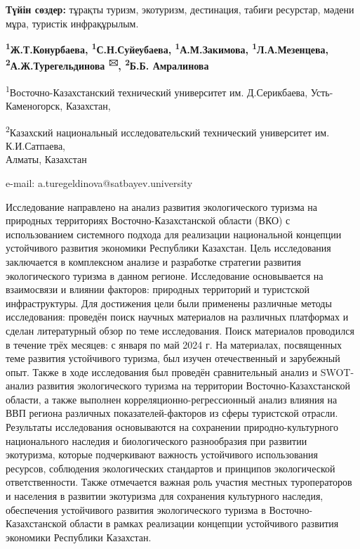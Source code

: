 {\bfseries Түйін сөздер:} тұрақты туризм, экотуризм, дестинация, табиғи
ресурстар, мәдени мұра, туристік инфрақұрылым.


\begin{center}
{\bfseries \textsuperscript{1}Ж.Т.Конурбаева,
\textsuperscript{1}С.Н.Суйеубаева, \textsuperscript{1}А.М.Закимова,
\textsuperscript{1}Л.А.Мезенцева,\\
\textsuperscript{2}А.Ж.Турегельдинова \textsuperscript{🖂},
\textsuperscript{2}Б.Б. Амралинова}

\textsuperscript{1}Восточно-Казахстанский технический университет им.
Д.Серикбаева, Усть-Каменогорск, Казахстан,

\textsuperscript{2}Казахский национальный исследовательский технический
университет им. К.И.Сатпаева,\\
Алматы, Казахстан

e-mail: a.turegeldinova@satbayev.university
\end{center}

Исследование направлено на анализ развития экологического туризма на
природных территориях Восточно-Казахстанской области (ВКО) с
использованием системного подхода для реализации национальной концепции
устойчивого развития экономики Республики Казахстан. Цель исследования
заключается в комплексном анализе и разработке стратегии развития
экологического туризма в данном регионе. Исследование основывается на
взаимосвязи и влиянии факторов: природных территорий и туристской
инфраструктуры. Для достижения цели были применены различные методы
исследования: проведён поиск научных материалов на различных платформах
и сделан литературный обзор по теме исследования. Поиск материалов
проводился в течение трёх месяцев: с января по май 2024 г. На
материалах, посвященных теме развития устойчивого туризма, был изучен
отечественный и зарубежный опыт. Также в ходе исследования был проведён
сравнительный анализ и SWOT-анализ развития экологического туризма на
территории Восточно-Казахстанской области, а также выполнен
корреляционно-регрессионный анализ влияния на ВВП региона различных
показателей-факторов из сферы туристской отрасли. Результаты
исследования основываются на сохранении природно-культурного
национального наследия и биологического разнообразия при развитии
экотуризма, которые подчеркивают важность устойчивого использования
ресурсов, соблюдения экологических стандартов и принципов экологической
ответственности. Также отмечается важная роль участия местных
туроператоров и населения в развитии экотуризма для сохранения
культурного наследия, обеспечения устойчивого развития экологического
туризма в Восточно-Казахстанской области в рамках реализации концепции
устойчивого развития экономики Республики Казахстан.

